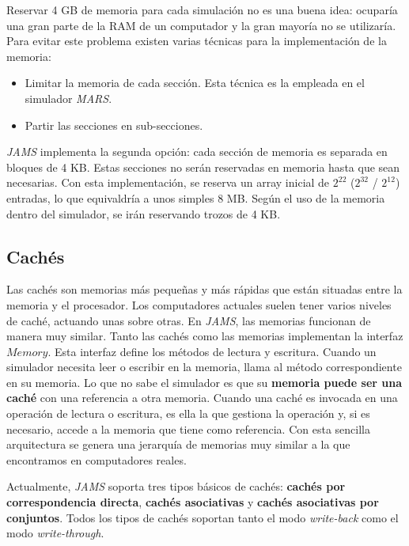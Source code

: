 \noindent Reservar 4 GB de memoria para cada simulación no es una buena idea:
ocuparía una gran parte de la RAM de un computador y la gran mayoría no se utilizaría.
Para evitar este problema existen varias técnicas para la
implementación de la memoria:
\begin{itemize}
    \item Limitar la memoria de cada sección.
    Esta técnica es la empleada en el simulador \textit{MARS}.
    \item Partir las secciones en sub-secciones.
\end{itemize}

\noindent \textit{JAMS} implementa la segunda opción:
cada sección de memoria es separada en bloques de 4 KB.
Estas secciones no serán reservadas en memoria
hasta que sean necesarias.
Con esta implementación, se reserva un array inicial de
$2^{22}$ ($2^{32}$ / $2^{12}$) entradas, lo que equivaldría
a unos simples 8 MB\@.
Según el uso de la memoria dentro del simulador,
se irán reservando trozos de 4 KB\@.

\subsection{Cachés}\label{subsec:caches}

Las cachés son memorias más pequeñas y más rápidas que están
situadas entre la memoria y el procesador.
Los computadores actuales suelen tener varios niveles de caché,
actuando unas sobre otras.
En \textit{JAMS}, las memorias funcionan de manera muy similar.
Tanto las cachés como las memorias implementan la interfaz $Memory$.
Esta interfaz define los métodos de lectura y escritura.
Cuando un simulador necesita leer o escribir en la memoria,
llama al método correspondiente en su memoria.
Lo que no sabe el simulador es que su \textbf{memoria puede ser una caché}
con una referencia a otra memoria.
Cuando una caché es invocada en una operación de lectura o escritura,
es ella la que gestiona la operación y,
si es necesario, accede a la memoria que tiene como referencia.
Con esta sencilla arquitectura se genera una jerarquía de memorias
muy similar a la que encontramos en computadores reales.

\noindent Actualmente, \textit{JAMS} soporta tres tipos básicos
de cachés: \textbf{cachés por correspondencia directa},
\textbf{cachés asociativas} y \textbf{cachés asociativas por conjuntos}.
Todos los tipos de cachés soportan tanto el modo \textit{write-back}
como el modo \textit{write-through}.

